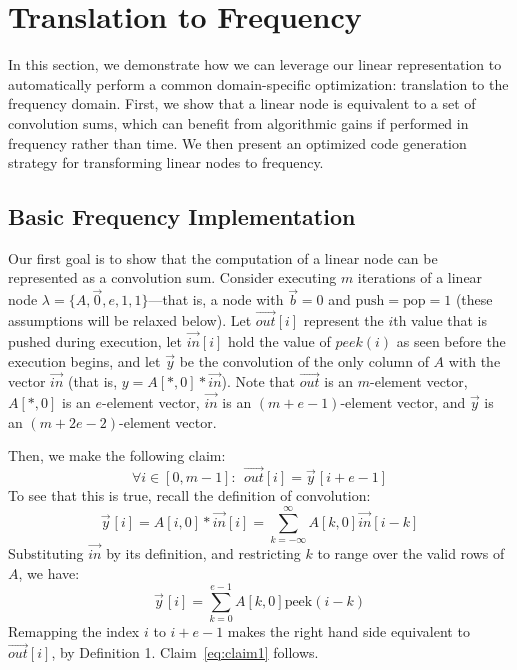 \section{Translation to Frequency}
\label{sec:freq}

In this section, we demonstrate how we can leverage our linear
representation to automatically perform a common domain-specific
optimization: translation to the frequency domain.  First, we show
that a linear node is equivalent to a set of convolution sums, which
can benefit from algorithmic gains if performed in frequency rather
than time.  We then present an optimized code generation strategy for
transforming linear nodes to frequency.

\subsection{Basic Frequency Implementation}

Our first goal is to show that the computation of a linear node can be
represented as a convolution sum.  Consider executing $m$ iterations
of a linear node $\lambda = \{A, {\vec 0}, e, 1, 1\}$---that is, a
node with $\vec{b} = 0$ and $\mbox{push}=\mbox{pop}=1$ (these
assumptions will be relaxed below).  Let $\vec{out}[i]$ represent the
$i$th value that is pushed during execution, let $\vec{in}[i]$ hold
the value of $peek(i)$ as seen before the execution begins, and let
${\vec y}$ be the convolution of the only column of $A$ with the
vector $\vec{in}$ (that is, $y = A[*,0] * {\vec{in}}$).
Note that $\vec{out}$ is an $m$-element vector, $A[*,0]$ is an
$e$-element vector, ${\vec{in}}$ is an $(m+e-1)$-element vector, and
${\vec y}$ is an $(m+2e-2)$-element vector.

Then, we make the following claim:
\begin{equation}
\label{eq:claim1}
\forall i \in [0, m-1]:~~{\vec{out}}[i] = {\vec y}\hspace{1pt}[i+e-1]
\end{equation}
To see that this is true, recall the definition of convolution:
\[
  {\vec y}\hspace{1pt}[i] = A[i,0] * \vec{in}[i] = \sum_{k=-\infty}^{\infty} A[k,0] \vec{in}[i-k]
\]
Substituting $\vec{in}$ by its definition, and restricting $k$ to
range over the valid rows of $A$, we have:
\[
  {\vec y}\hspace{1pt}[i] = \sum_{k=0}^{e-1} A[k,0] \mbox{peek}(i-k)
\]
Remapping the index $i$ to $i+e-1$ makes the right hand side
equivalent to ${\vec{out}}[i]$, by Definition 1.
Claim~\ref{eq:claim1} follows.

